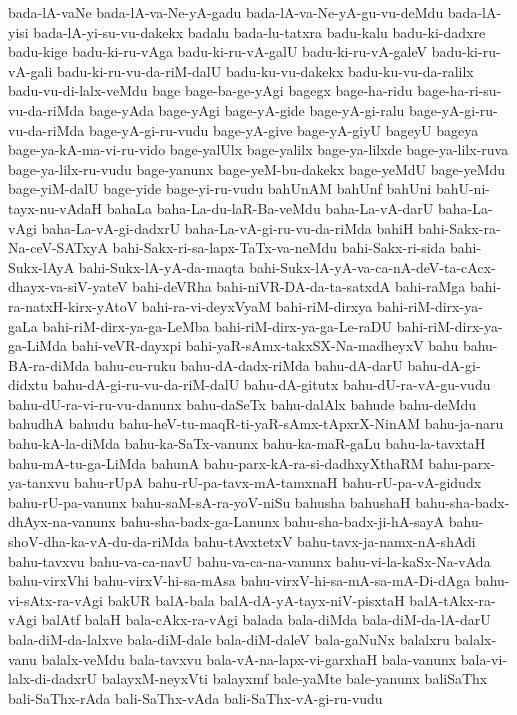 {bada-lA-vaNe
bada-lA-va-Ne-yA-gadu
bada-lA-va-Ne-yA-gu-vu-deMdu
bada-lA-yisi
bada-lA-yi-su-vu-dakekx
badalu
bada-lu-tatxra
badu-kalu
badu-ki-dadxre
badu-kige
badu-ki-ru-vAga
badu-ki-ru-vA-galU
badu-ki-ru-vA-galeV
badu-ki-ru-vA-gali
badu-ki-ru-vu-da-riM-dalU
badu-ku-vu-dakekx
badu-ku-vu-da-ralilx
badu-vu-di-lalx-veMdu
bage
bage-ba-ge-yAgi
bagegx
bage-ha-ridu
bage-ha-ri-su-vu-da-riMda
bage-yAda
bage-yAgi
bage-yA-gide
bage-yA-gi-ralu
bage-yA-gi-ru-vu-da-riMda
bage-yA-gi-ru-vudu
bage-yA-give
bage-yA-giyU
bageyU
bageya
bage-ya-kA-ma-vi-ru-vido
bage-yalUlx
bage-yalilx
bage-ya-lilxde
bage-ya-lilx-ruva
bage-ya-lilx-ru-vudu
bage-yanunx
bage-yeM-bu-dakekx
bage-yeMdU
bage-yeMdu
bage-yiM-dalU
bage-yide
bage-yi-ru-vudu
bahUnAM
bahUnf
bahUni
bahU-ni-tayx-nu-vAdaH
bahaLa
baha-La-du-laR-Ba-veMdu
baha-La-vA-darU
baha-La-vAgi
baha-La-vA-gi-dadxrU
baha-La-vA-gi-ru-vu-da-riMda
bahiH
bahi-Sakx-ra-Na-ceV-SATxyA
bahi-Sakx-ri-sa-lapx-TaTx-va-neMdu
bahi-Sakx-ri-sida
bahi-Sukx-lAyA
bahi-Sukx-lA-yA-da-maqta
bahi-Sukx-lA-yA-va-ca-nA-deV-ta-cAcx-dhayx-va-siV-yateV
bahi-deVRha
bahi-niVR-DA-da-ta-satxdA
bahi-raMga
bahi-ra-natxH-kirx-yAtoV
bahi-ra-vi-deyxVyaM
bahi-riM-dirxya
bahi-riM-dirx-ya-gaLa
bahi-riM-dirx-ya-ga-LeMba
bahi-riM-dirx-ya-ga-Le-raDU
bahi-riM-dirx-ya-ga-LiMda
bahi-veVR-dayxpi
bahi-yaR-sAmx-takxSX-Na-madheyxV
bahu
bahu-BA-ra-diMda
bahu-cu-ruku
bahu-dA-dadx-riMda
bahu-dA-darU
bahu-dA-gi-didxtu
bahu-dA-gi-ru-vu-da-riM-dalU
bahu-dA-gitutx
bahu-dU-ra-vA-gu-vudu
bahu-dU-ra-vi-ru-vu-danunx
bahu-daSeTx
bahu-dalAlx
bahude
bahu-deMdu
bahudhA
bahudu
bahu-heV-tu-maqR-ti-yaR-sAmx-tApxrX-NinAM
bahu-ja-naru
bahu-kA-la-diMda
bahu-ka-SaTx-vanunx
bahu-ka-maR-gaLu
bahu-la-tavxtaH
bahu-mA-tu-ga-LiMda
bahunA
bahu-parx-kA-ra-si-dadhxyXthaRM
bahu-parx-ya-tanxvu
bahu-rUpA
bahu-rU-pa-tavx-mA-tamxnaH
bahu-rU-pa-vA-gidudx
bahu-rU-pa-vanunx
bahu-saM-sA-ra-yoV-niSu
bahusha
bahushaH
bahu-sha-badx-dhAyx-na-vanunx
bahu-sha-badx-ga-Lanunx
bahu-sha-badx-ji-hA-sayA
bahu-shoV-dha-ka-vA-du-da-riMda
bahu-tAvxtetxV
bahu-tavx-ja-namx-nA-shAdi
bahu-tavxvu
bahu-va-ca-navU
bahu-va-ca-na-vanunx
bahu-vi-la-kaSx-Na-vAda
bahu-virxVhi
bahu-virxV-hi-sa-mAsa
bahu-virxV-hi-sa-mA-sa-mA-Di-dAga
bahu-vi-sAtx-ra-vAgi
bakUR
balA-bala
balA-dA-yA-tayx-niV-pisxtaH
balA-tAkx-ra-vAgi
balAtf
balaH
bala-cAkx-ra-vAgi
balada
bala-diMda
bala-diM-da-lA-darU
bala-diM-da-lalxve
bala-diM-dale
bala-diM-daleV
bala-gaNuNx
balalxru
balalx-vanu
balalx-veMdu
bala-tavxvu
bala-vA-na-lapx-vi-garxhaH
bala-vanunx
bala-vi-lalx-di-dadxrU
balayxM-neyxVti
balayxmf
bale-yaMte
bale-yanunx
baliSaThx
bali-SaThx-rAda
bali-SaThx-vAda
bali-SaThx-vA-gi-ru-vudu
}
